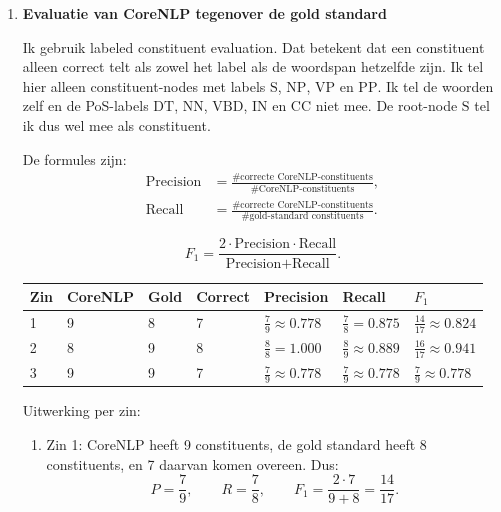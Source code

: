 \documentclass[11pt,a4paper]{article}
\newcommand{\nt}[1]{\ensuremath{\mathrm{#1}}}
\begin{document}
\begin{enumerate}
De kansen zijn dus verschillend. De correcte boom heeft een hogere kans dan de CoreNLP-boom:
\[
P(T_{\text{correct}}) > P(T_{\text{CoreNLP}}).
\]
De correcte boom is ongeveer $4.25$ keer zo waarschijnlijk volgens deze PCFG.

\item \textbf{Evaluatie van CoreNLP tegenover de gold standard}

Ik gebruik labeled constituent evaluation. Dat betekent dat een constituent alleen correct telt als zowel het label als de woordspan hetzelfde zijn. Ik tel hier alleen constituent-nodes met labels $\nt{S}$, $\nt{NP}$, $\nt{VP}$ en $\nt{PP}$. Ik tel de woorden zelf en de PoS-labels $\nt{DT}$, $\nt{NN}$, $\nt{VBD}$, $\nt{IN}$ en $\nt{CC}$ niet mee. De root-node $\nt{S}$ tel ik dus wel mee als constituent.

De formules zijn:
\[
\begin{aligned}
\text{Precision}
&=\frac{\#\text{correcte CoreNLP-constituents}}{\#\text{CoreNLP-constituents}},\\
\text{Recall}
&=\frac{\#\text{correcte CoreNLP-constituents}}{\#\text{gold-standard constituents}}.
\end{aligned}
\]

\[
F_1 = \frac{2\cdot \text{Precision}\cdot \text{Recall}}{\text{Precision}+\text{Recall}}.
\]

\begin{center}
\small
\begin{tabular}{lllllll}
\toprule
Zin & CoreNLP & Gold & Correct & Precision & Recall & $F_1$ \\
\midrule
1 & 9 & 8 & 7 & $\frac{7}{9}\approx 0.778$ & $\frac{7}{8}=0.875$ & $\frac{14}{17}\approx 0.824$ \\
2 & 8 & 9 & 8 & $\frac{8}{8}=1.000$ & $\frac{8}{9}\approx 0.889$ & $\frac{16}{17}\approx 0.941$ \\
3 & 9 & 9 & 7 & $\frac{7}{9}\approx 0.778$ & $\frac{7}{9}\approx 0.778$ & $\frac{7}{9}\approx 0.778$ \\
\bottomrule
\end{tabular}
\end{center}

Uitwerking per zin:
\begin{enumerate}
  \item Zin 1: CoreNLP heeft 9 constituents, de gold standard heeft 8 constituents, en 7 daarvan komen overeen. Dus:
  \[
  P=\frac{7}{9},\qquad R=\frac{7}{8},\qquad F_1=\frac{2\cdot 7}{9+8}=\frac{14}{17}.
  \]


\end{enumerate}
\end{enumerate}
\end{document}
